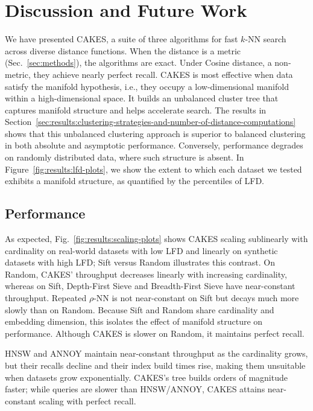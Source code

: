 \section{Discussion and Future Work}
\label{sec:discussion-and-future-work}

We have presented CAKES, a suite of three algorithms for fast $k$-NN search across diverse distance functions.
When the distance is a metric (Sec.~\ref{sec:methods}), the algorithms are exact.
Under Cosine distance, a non-metric, they achieve nearly perfect recall.
CAKES is most effective when data satisfy the manifold hypothesis, i.e., they occupy a low-dimensional manifold within a high-dimensional space.
It builds an unbalanced cluster tree that captures manifold structure and helps accelerate search. The results in Section~\ref{sec:results:clustering-strategies-and-number-of-distance-computations} shows that this unbalanced clustering approach is superior to balanced clustering in both absolute and asymptotic performance.
Conversely, performance degrades on randomly distributed data, where such structure is absent.
In Figure~\ref{fig:results:lfd-plots}, we show the extent to which each dataset we tested exhibits a manifold structure, as quantified by the percentiles of LFD.


\subsection{Performance}

As expected, Fig.~\ref{fig:results:scaling-plots} shows CAKES scaling sublinearly with cardinality on real-world datasets with low LFD and linearly on synthetic datasets with high LFD;
Sift versus Random illustrates this contrast.
On Random, CAKES' throughput decreases linearly with increasing cardinality, whereas on Sift, Depth-First Sieve and Breadth-First Sieve have near-constant throughput.
Repeated $\rho$-NN is not near-constant on Sift but decays much more slowly than on Random.
Because Sift and Random share cardinality and embedding dimension, this isolates the effect of manifold structure on performance.
Although CAKES is slower on Random, it maintains perfect recall.

HNSW and ANNOY maintain near-constant throughput as the cardinality grows, but their recalls decline and their index build times rise, making them unsuitable when datasets grow exponentially.
CAKES's tree builds orders of magnitude faster; while queries are slower than HNSW/ANNOY, CAKES attains near-constant scaling with perfect recall.

